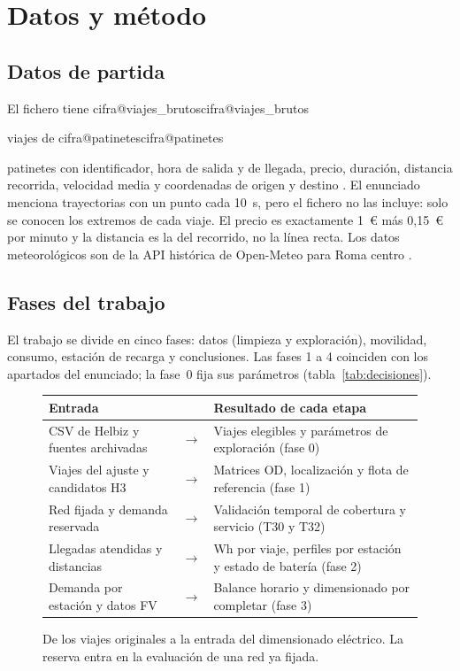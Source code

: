 \documentclass[11pt,a4paper]{article}
\makeatletter
\newcommand\cifra[1]{\ifcsname cifra@#1\endcsname\csname cifra@#1\endcsname
  \else\PackageError{memoria}{Cifra desconocida: \detokenize{#1}}{Revisa generar_cifras.py}\fi}
\makeatother
\begin{document}
\section{Datos y método}

\subsection{Datos de partida}
El fichero tiene \cifra{viajes_brutos} viajes de \cifra{patinetes} patinetes con
identificador, hora de salida y de llegada, precio, duración, distancia recorrida,
velocidad media y coordenadas de origen y destino \cite{datos}. El enunciado menciona
trayectorias con un punto cada 10~s, pero el fichero no las incluye: solo se conocen los
extremos de cada viaje. El precio es exactamente 1~€ más 0,15~€ por minuto y la
distancia es la del recorrido, no la línea recta. Los datos meteorológicos son de la API
histórica de Open-Meteo para Roma centro \cite{openmeteo,era5}.

\subsection{Fases del trabajo}\label{sec:fases}
El trabajo se divide en cinco fases: datos (limpieza y exploración), movilidad, consumo,
estación de recarga y conclusiones. Las fases 1 a 4 coinciden con los apartados del
enunciado; la fase~0 fija sus parámetros (tabla~\ref{tab:decisiones}).

\begin{figure}[!htb]
  \centering\small
  \begin{tabularx}{0.96\textwidth}{@{}l c Y@{}}
    \toprule
    Entrada & & Resultado de cada etapa \\
    \midrule
    CSV de Helbiz y fuentes archivadas & $\longrightarrow$ & Viajes elegibles y parámetros de exploración (fase 0) \\
    Viajes del ajuste y candidatos H3 & $\longrightarrow$ & Matrices OD, localización y flota de referencia (fase 1) \\
    Red fijada y demanda reservada & $\longrightarrow$ & Validación temporal de cobertura y servicio (T30 y T32) \\
    Llegadas atendidas y distancias & $\longrightarrow$ & Wh por viaje, perfiles por estación y estado de batería (fase 2) \\
    Demanda por estación y datos FV & $\longrightarrow$ & Balance horario y dimensionado por completar (fase 3) \\
    \bottomrule
  \end{tabularx}
  \caption{De los viajes originales a la entrada del dimensionado eléctrico. La reserva entra en la evaluación de una red ya fijada.}
  \label{fig:cadena-datos}
\end{figure}
\end{document}
